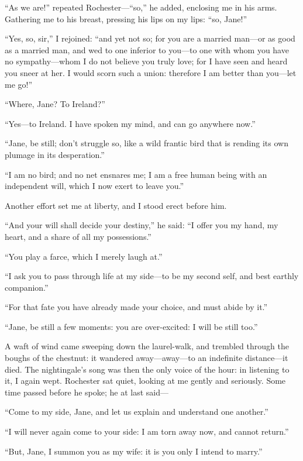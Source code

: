 \enquote{As we are!} repeated \Mr{} Rochester---\enquote{so,} he added,
enclosing me in his arms. Gathering me to his breast, pressing his lips
on my lips: \enquote{so, Jane!}

\enquote{Yes, so, sir,} I rejoined: \enquote{and yet not so; for you are
a married man---or as good as a married man, and wed to one inferior to
you---to one with whom you have no sympathy---whom I do not believe you
truly love; for I have seen and heard you sneer at her. I would scorn
such a union: therefore I am better than you---let me go!}

\enquote{Where, Jane? To Ireland?}

\enquote{Yes---to Ireland. I have spoken my mind, and can go anywhere
now.}

\enquote{Jane, be still; don't struggle so, like a wild frantic bird
that is rending its own plumage in its desperation.}

\enquote{I am no bird; and no net ensnares me; I am a free human being
with an independent will, which I now exert to leave you.}

Another effort set me at liberty, and I stood erect before him.

\enquote{And your will shall decide your destiny,} he said: \enquote{I
offer you my hand, my heart, and a share of all my possessions.}

\enquote{You play a farce, which I merely laugh at.}

\enquote{I ask you to pass through life at my side---to be my second
self, and best earthly companion.}

\enquote{For that fate you have already made your choice, and must abide
by it.}

\enquote{Jane, be still a few moments: you are over-excited: I will be
still too.}

A waft of wind came sweeping down the laurel-walk, and trembled through
the boughs of the chestnut: it wandered away---away---to an indefinite
distance---it died. The nightingale's song was then the only voice of
the hour: in listening to it, I again wept. \Mr{} Rochester sat quiet,
looking at me gently and seriously. Some time passed before he spoke;
he at last said---

\enquote{Come to my side, Jane, and let us explain and understand one
another.}

\enquote{I will never again come to your side: I am torn away now, and
cannot return.}

\enquote{But, Jane, I summon you as my wife: it is you only I intend to
marry.}

